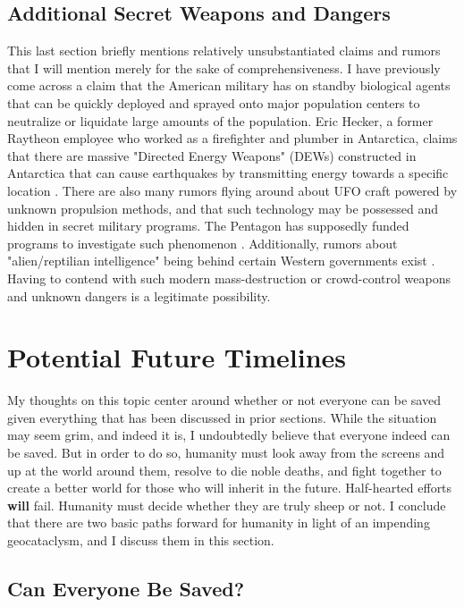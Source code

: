 \documentclass[10pt,twocolumn,letterpaper]{article}
\begin{document}
\subsection{Additional Secret Weapons and Dangers}

This last section briefly mentions relatively unsubstantiated claims and rumors that I will mention merely for the sake of comprehensiveness. I have previously come across a claim that the American military has on standby biological agents that can be quickly deployed and sprayed onto major population centers to neutralize or liquidate large amounts of the population. Eric Hecker, a former Raytheon employee who worked as a firefighter and plumber in Antarctica, claims that there are massive "Directed Energy Weapons" (DEWs) constructed in Antarctica that can cause earthquakes by transmitting energy towards a specific location \cite{43,44}. There are also many rumors flying around about UFO craft powered by unknown propulsion methods, and that such technology may be possessed and hidden in secret military programs. The Pentagon has supposedly funded programs to investigate such phenomenon \cite{59}. Additionally, rumors about "alien/reptilian intelligence" being behind certain Western governments exist \cite{58,55}. Having to contend with such modern mass-destruction or crowd-control weapons and unknown dangers is a legitimate possibility.

\section{Potential Future Timelines}

My thoughts on this topic center around whether or not everyone can be saved given everything that has been discussed in prior sections. While the situation may seem grim, and indeed it is, I undoubtedly believe that everyone indeed can be saved. But in order to do so, humanity must look away from the screens and up at the world around them, resolve to die noble deaths, and fight together to create a better world for those who will inherit in the future. Half-hearted efforts \textbf{will} fail. Humanity must decide whether they are truly sheep or not. I conclude that there are two basic paths forward for humanity in light of an impending geocataclysm, and I discuss them in this section.

\subsection{Can Everyone Be Saved?}
\end{document}

